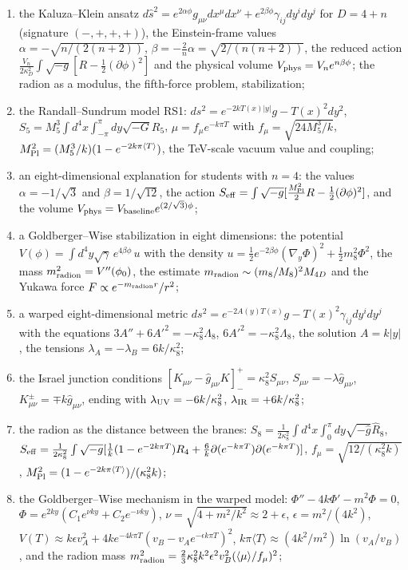 \documentclass[10pt,a4paper]{article}
\begin{document}
\begin{enumerate}
\item the Kaluza–Klein ansatz $d\hat s^2=e^{2\alpha\phi}g_{\mu\nu}dx^\mu dx^\nu+e^{2\beta\phi}\gamma_{ij}dy^idy^j$ for $D=4+n$ (signature $(-,+,+,+)$), the Einstein-frame values $\alpha=-\sqrt{n/(2(n+2))}$, $\beta=-\frac2n\alpha=\sqrt{2/(n(n+2))}$, the reduced action $\frac{V_n}{2\kappa_D^2}\int\sqrt{-g}[R-\frac12(\partial\phi)^2]$ and the physical volume $V_{\rm phys}=V_ne^{n\beta\phi}$; the radion as a modulus, the fifth-force problem, stabilization;
\item the Randall–Sundrum model RS1: $ds^2=e^{-2kT(x)|y|}g-T(x)^2dy^2$, $S_5=M_5^3\int d^4x\int_{-\pi}^{\pi}dy\sqrt{-G}R_5$, $\mu=f_\mu e^{-k\pi T}$ with $f_\mu=\sqrt{24M_5^3/k}$, $M_{\rm Pl}^2=(M_5^3/k)(1-e^{-2k\pi\langle T\rangle})$, the TeV-scale vacuum value and coupling;
\item an eight-dimensional explanation for students with $n=4$: the values $\alpha=-1/\sqrt3$ and $\beta=1/\sqrt{12}$, the action $S_{\rm eff}=\int\sqrt{-g}[\frac{M_{\rm Pl}^2}2R-\frac12(\partial\phi)^2]$, and the volume $V_{\rm phys}=V_{\rm baseline}e^{(2/\sqrt3)\phi}$;
\item a Goldberger–Wise stabilization in eight dimensions: the potential $V(\phi)=\int d^4y\sqrt\gamma\,e^{4\beta\phi}\,u$ with the density $u=\frac12e^{-2\beta\phi}(\nabla_y\Phi)^2+\frac12m_8^2\Phi^2$, the mass $m_{\rm radion}^2=V''(\phi_0)$, the estimate $m_{\rm radion}\sim(m_8/M_8)^2M_{4D}$ and the Yukawa force $F\propto e^{-m_{\rm radion}r}/r^2$;
\item a warped eight-dimensional metric $ds^2=e^{-2A(y)T(x)}g-T(x)^2\gamma_{ij}dy^idy^j$ with the equations $3A''+6A'^2=-\kappa_8^2\Lambda_8$, $6A'^2=-\kappa_8^2\Lambda_8$, the solution $A=k|y|$, the tensions $\lambda_A=-\lambda_B=6k/\kappa_8^2$;
\item the Israel junction conditions $[K_{\mu\nu}-\hat g_{\mu\nu}K]^+_-=\kappa_8^2S_{\mu\nu}$, $S_{\mu\nu}=-\lambda\hat g_{\mu\nu}$, $K^\pm_{\mu\nu}=\mp k\hat g_{\mu\nu}$, ending with $\lambda_{\rm UV}=-6k/\kappa_8^2$, $\lambda_{\rm IR}=+6k/\kappa_8^2$;
\item the radion as the distance between the branes: $S_8=\frac1{2\kappa_8^2}\int d^4x\int_0^\pi dy\sqrt{-\hat g}\hat R_8$, $S_{\rm eff}=\frac1{2\kappa_8^2}\int\sqrt{-g}[\frac1k(1-e^{-2k\pi T})R_4+\frac6k\partial(e^{-k\pi T})\partial(e^{-k\pi T})]$, $f_\mu=\sqrt{12/(\kappa_8^2k)}$, $M_{\rm Pl}^2=(1-e^{-2k\pi\langle T\rangle})/(\kappa_8^2k)$;
\item the Goldberger–Wise mechanism in the warped model: $\Phi''-4k\Phi'-m^2\Phi=0$, $\Phi=e^{2ky}(C_1e^{\nu ky}+C_2e^{-\nu ky})$, $\nu=\sqrt{4+m^2/k^2}\approx2+\epsilon$, $\epsilon=m^2/(4k^2)$, $V(T)\approx k\epsilon v_A^2+4ke^{-4k\pi T}(v_B-v_Ae^{-\epsilon k\pi T})^2$, $k\pi\langle T\rangle\approx(4k^2/m^2)\ln(v_A/v_B)$, and the radion mass $m_{\rm radion}^2=\frac23\kappa_8^2k^2\epsilon^2v_B^2(\langle\mu\rangle/f_\mu)^2$;

\end{enumerate}
\end{document}
